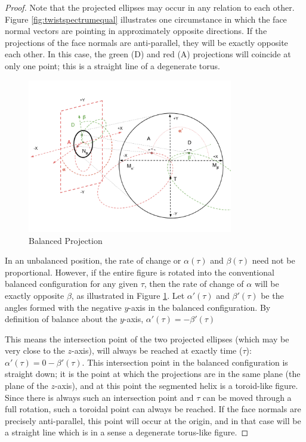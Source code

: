 \documentclass[11pt]{article}
\begin{document}
{\begin{proof}
    Note that the projected ellipses may occur in any relation to each other.
    Figure \ref{fig:twistspectrumequal} illustrates one circumstance in which the face normal
    vectors are pointing in approximately opposite directions.
    If the
    projections of the
    face normals are anti-parallel, they will be exactly opposite each other. In this
    case, the green (D) and red (A) projections will coincide at only one point; this
    is a straight line of a degenerate torus.
        \begin{figure}
     \centering
     \includegraphics[width=0.80\textwidth]{figures/TwistSpectrumProjection.png}
     \caption{Balanced Projection}
  \label{fig:twistspectrumprojection}
    \end{figure}

    In an unbalanced position, the rate of change or $\alpha(\tau)$ and $\beta(\tau)$
    need not be proportional.
    However, if the entire figure is rotated into
    the conventional balanced configuration for any given $\tau$, then the rate of
    change of $\alpha$ will be exactly opposite $\beta$,
    as illustrated in Figure \ref{fig:twistspectrumprojection}. Let $\alpha'(\tau)$ and $\beta'(\tau)$ be the angles
    formed with the negative $y$-axis in the balanced configuration. By definition of balance about the $y$-axis,
    $\alpha'(\tau) = -\beta'(\tau)$

    This means the
    intersection point of the two projected ellipses (which may be very close to the
    $z$-axis), will always be reached at exactly time ($\tau$): $\alpha'(\tau) = 0 - \beta'(\tau)$.
    This intersection point
    in the balanced configuration is straight down; it is the point at which the projections
    are in the same plane (the plane of the $z$-axis), and at this point the segmented
    helix is a toroid-like figure. Since there is always such an intersection point
    and  $\tau$ can be moved through a full rotation, such a toroidal point can always be reached.
    If the face normals are precisely anti-parallel, this point will occur at the origin,
    and in that case will be a straight line which is in a sense a degenerate torus-like figure.


\end{proof}}
\end{document}
